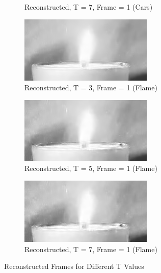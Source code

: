 \documentclass{article}
\begin{document}
\begin{enumerate}
\begin{figure}[h!]
\begin{subfigure}{0.3\textwidth}
        \caption{Reconstructed, T = 7, Frame = 1 (Cars)}
    \end{subfigure}
    \begin{subfigure}{0.3\textwidth}
        \centering
        \includegraphics[width=\linewidth]{../images/flame/reconstructed, T = 3, frame = 1.png}
        \caption{Reconstructed, T = 3, Frame = 1 (Flame)}
    \end{subfigure}
    \begin{subfigure}{0.3\textwidth}
        \centering
        \includegraphics[width=\linewidth]{../images/flame/reconstructed, T = 5, frame = 1.png}
        \caption{Reconstructed, T = 5, Frame = 1 (Flame)}
    \end{subfigure}
    \begin{subfigure}{0.3\textwidth}
        \centering
        \includegraphics[width=\linewidth]{../images/flame/reconstructed, T = 7, frame = 1.png}
        \caption{Reconstructed, T = 7, Frame = 1 (Flame)}
    \end{subfigure}
    \caption{Reconstructed Frames for Different T Values}
\end{figure}
\newpage 

\end{enumerate}
\end{document}
